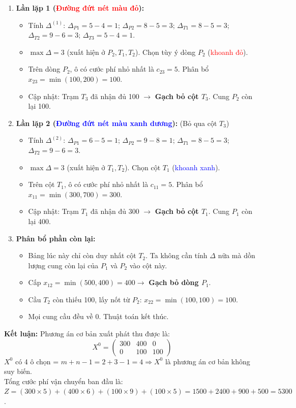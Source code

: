 \begin{enumerate}
    \item \textbf{Lần lặp 1 (\textcolor{red}{Đường đứt nét màu đỏ}):} 
    \begin{itemize}
        \item Tính $\Delta^{(1)}$: $\Delta_{P1} = 5 - 4 = 1$; $\Delta_{P2} = 8 - 5 = 3$; $\Delta_{T1} = 8 - 5 = 3$; $\Delta_{T2} = 9 - 6 = 3$; $\Delta_{T3} = 5 - 4 = 1$.
        \item $\max \Delta = 3$ (xuất hiện ở $P_2, T_1, T_2$). Chọn tùy ý dòng $P_2$ (\textcolor{red}{khoanh đỏ}).
        \item Trên dòng $P_2$, ô có cước phí nhỏ nhất là $c_{23} = 5$. Phân bổ $x_{23} = \min(100, 200) = 100$.
        \item Cập nhật: Trạm $T_3$ đã nhận đủ 100 $\rightarrow$ \textbf{Gạch bỏ cột $T_3$}. Cung $P_2$ còn lại 100.
    \end{itemize}
    
    \item \textbf{Lần lặp 2 (\textcolor{blue}{Đường đứt nét màu xanh dương}):} (Bỏ qua cột $T_3$)
    \begin{itemize}
        \item Tính $\Delta^{(2)}$: $\Delta_{P1} = 6 - 5 = 1$; $\Delta_{P2} = 9 - 8 = 1$; $\Delta_{T1} = 8 - 5 = 3$; $\Delta_{T2} = 9 - 6 = 3$.
        \item $\max \Delta = 3$ (xuất hiện ở $T_1, T_2$). Chọn cột $T_1$ (\textcolor{blue}{khoanh xanh}).
        \item Trên cột $T_1$, ô có cước phí nhỏ nhất là $c_{11} = 5$. Phân bổ $x_{11} = \min(300, 700) = 300$.
        \item Cập nhật: Trạm $T_1$ đã nhận đủ 300 $\rightarrow$ \textbf{Gạch bỏ cột $T_1$}. Cung $P_1$ còn lại 400.
    \end{itemize}

    \item \textbf{Phân bổ phần còn lại:} 
    \begin{itemize}
        \item Bảng lúc này chỉ còn duy nhất cột $T_2$. Ta không cần tính $\Delta$ nữa mà dồn lượng cung còn lại của $P_1$ và $P_2$ vào cột này.
        \item Cấp $x_{12} = \min(500, 400) = 400 \rightarrow$ \textbf{Gạch bỏ dòng $P_1$}.
        \item Cầu $T_2$ còn thiếu 100, lấy nốt từ $P_2$: $x_{22} = \min(100, 100) = 100$.
        \item Mọi cung cầu đều về 0. Thuật toán kết thúc.
    \end{itemize}
\end{enumerate}

\textbf{Kết luận:} Phương án cơ bản xuất phát thu được là:
\[ X^0 = \begin{pmatrix} 300 & 400 & 0 \\ 0 & 100 & 100 \end{pmatrix} \]
$X^0$ có 4 ô chọn = $m + n - 1 = 2 + 3 - 1 = 4 \Rightarrow X^0$ là phương án cơ bản không suy biến. \\
Tổng cước phí vận chuyển ban đầu là: 
$Z = (300 \times 5) + (400 \times 6) + (100 \times 9) + (100 \times 5) = 1500 + 2400 + 900 + 500 = 5300$.